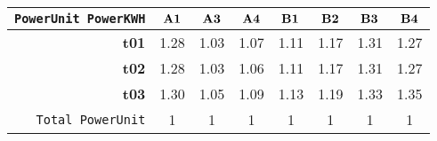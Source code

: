\begin{tabular}{r|ccccccc}\cline{2-8}
\tt PowerUnit PowerKWH&$\bf A1$&$\bf A3$&$\bf A4$&$\bf B1$&$\bf B2$&$\bf B3$&$\bf B4$\\\hline
\bf t01& 1.28& 1.03& 1.07& 1.11& 1.17& 1.31& 1.27\\
\bf t02& 1.28& 1.03& 1.06& 1.11& 1.17& 1.31& 1.27\\
\bf t03& 1.30& 1.05& 1.09& 1.13& 1.19& 1.33& 1.35\\
\hline
\tt Total PowerUnit& 1& 1& 1& 1& 1& 1& 1\\
\end{tabular}
